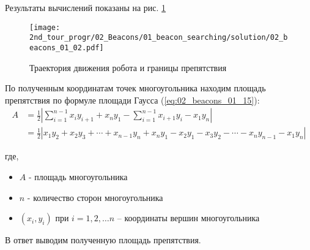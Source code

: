 Результаты вычислений показаны на рис. \ref{fig:02_beacons_01_02}

\begin{figure}[h!]
	\centering
	\texttt{[image: 2nd\_tour\_progr/02\_Beacons/01\_beacon\_searching/solution/02\_beacons\_01\_02.pdf]}
	\caption{Траектория движения робота и границы препятствия}
	\label{fig:02_beacons_01_02}
\end{figure}


По полученным координатам точек многоугольника находим площадь препятствия по формуле площади Гаусса (\ref{eq:02_beacons_01_15}):
\begin{equation}
	\begin{aligned}
		A & =\frac{1}{2} 
		\left|\sum_{i=1}^{n-1} x_i y_{i+1} + x_n y_1 - \sum_{i=1}^{n-1} x_{i+1} y_i -  x_1 y_n \right| \\ 
		& =
		\frac {1}{2} |x_1 y_2 + x_2 y_3 + \cdots + x_{n-1}y_n + x_n y_1 - x_2 y_1 - x_3 y_2- \cdots - x_n y_{n-1} - x_1 y_n |
	\end{aligned}
	\label{eq:02_beacons_01_15}
\end{equation}

где,
\begin{itemize}
	\item $A$ - площадь многоугольника
	\item $n$ - количество сторон многоугольника
	\item $(x_i, y_i)$ при $i = 1, 2, \dots n $ – координаты вершин многоугольника	
\end{itemize} 


В ответ выводим полученную площадь препятствия.


\codeExample

